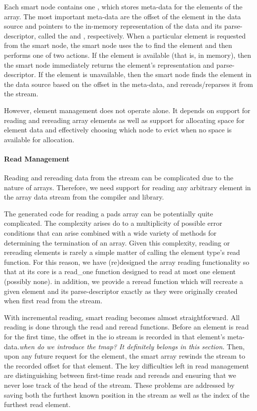 \documentclass{article}
\begin{document}
Each smart node contains one \emd, which stores meta-data for the elements of
the array. The most important meta-data are the offset of the element
in the data source and pointers to the in-memory representation of the
data and its parse-descriptor, called the \rep and \pd, respectively.
When a particular element is requested from the smart node, the smart
node uses the \emd to find the element and then performs one of two
actions. If the element is available (that is, in memory), then the
smart node immediately returns the element's representation and
parse-descriptor. If the element is unavailable, then the smart node
finds the element in the data source based on the offset in the
meta-data, and rereads/reparses it from the stream.

However, element management does not operate alone. It depends on
support for reading and rereading array elements as well as support
for allocating space for element data and effectively choosing
which node to evict when no space is available for allocation.

\paragraph{Read Management}

Reading and rereading data from the stream can be complicated due to
the nature of \pads arrays. Therefore, we need support for reading any
arbitrary element in the array data stream from the \pads compiler and
library.

The generated code for reading a pads array can be potentially quite
complicated. The complexity arises do to a multiplicity of possible
error conditions that can arise combined with a wide variety of
methods for determining the termination of an array. Given this
complexity, reading or rereading elements is rarely a simple matter of
calling the element type's read function. For this reason, we have
(re)designed the array reading functionality so that at its core is a
read\_one function designed to read at most one element (possibly
none). in addition, we provide a reread function which will recreate a
given element and its parse-descriptor exactly as they were originally
created when first read from the stream.

With incremental reading, smart reading becomes almost
straightforward. All reading is done through the read and reread
functions. Before an element is read for the first time, the offset in
the io stream is recorded in that element's meta-data.{\em when do we
  introduce the tmap? It definitely belongs in this section.}  Then,
upon any future request for the element, the smart array rewinds the
stream to the recorded offset for that element. The key difficulties
left in read management are distinguishing between first-time reads
and rereads and ensuring that we never lose track of the head of the
stream. These problems are addressed by saving both the furthest known
position in the stream as well as the index of the furthest read
element.
\end{document}
